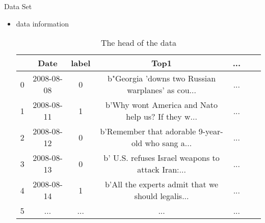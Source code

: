 \documentclass[
 size=12pt,
 paper=smartboard, %
 mode=present, %
 display=slides, %
style=tuliplab,
pauseslide,
fleqn,leqno]{powerdot}
\begin{document}
  \begin{slide}{Data Set}
  \begin{itemize}


    \item data information
    \begin{table}[htbp]  \centering
      \caption{The head of the data}
      \label{tbl:data information}
      \begin{tabular}{ccccccc}
        \hline
        & Date & label & Top1 & ...\\
        \hline
        0 & 2008-08-08    & 0     & b"Georgia 'downs two Russian warplanes' as cou... & ...\\
        1 & 2008-08-11    & 1     & b'Why wont America and Nato help us? If they w... & ...\\
        2 & 2008-08-12    & 0     & b'Remember that adorable 9-year-old who sang a... & ...\\
        3 & 2008-08-13    & 0     & b' U.S. refuses Israel weapons to attack Iran:... & ...\\
        4 & 2008-08-14    & 1     & b'All the experts admit that we should legalis... & ...\\
        5 & ...           & ...   & ...                                               & ...\\
        \hline 
      \end{tabular}
    \end{table}
    \

  \end{itemize}
\end{slide}
\end{document}

